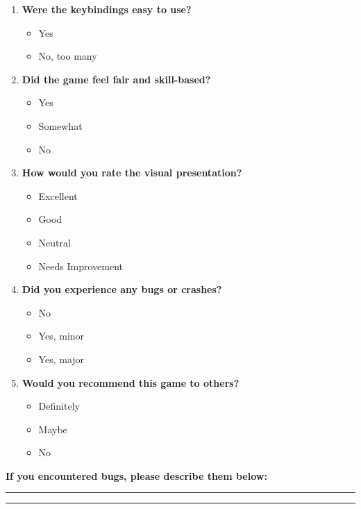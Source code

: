 \documentclass{article}
\begin{document}
\begin{multicols}{2}
\begin{enumerate}
    \item \textbf{Were the keybindings easy to use?}
    \begin{itemize}
        \item Yes
        \item No, too many
    \end{itemize}

    \item \textbf{Did the game feel fair and skill-based?}
    \begin{itemize}
        \item Yes
        \item Somewhat
        \item No
    \end{itemize}

    \item \textbf{How would you rate the visual presentation?}
    \begin{itemize}
        \item Excellent
        \item Good
        \item Neutral
        \item Needs Improvement
    \end{itemize}

    \item \textbf{Did you experience any bugs or crashes?}
    \begin{itemize}
        \item No
        \item Yes, minor
        \item Yes, major
    \end{itemize}

    \item \textbf{Would you recommend this game to others?}
    \begin{itemize}
        \item Definitely
        \item Maybe
        \item No
    \end{itemize}

\end{enumerate}
\end{multicols}

\vspace{1em}
\noindent\textbf{If you encountered bugs, please describe them below:}
\vspace{2em}
\noindent\rule{0.8\textwidth}{0.4pt}
\vspace{2em}
\noindent\rule{1.0\textwidth}{0.4pt}

\vspace{5cm}
\end{document}
